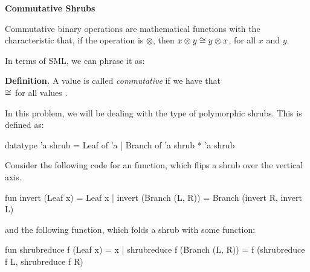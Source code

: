 \documentclass[addpoints,12pt, answers]{exam}
\begin{document}
\begin{questions}

\newpage
{}

\textbf{Commutative Shrubs}

Commutative binary operations are mathematical functions with the characteristic
that, if the operation is $\otimes$, then $x \otimes y \cong y \otimes x$, for
all $x$ and $y$.

In terms of SML, we can phrase it as:

\textbf{Definition.} A value  is called \textit{commutative} if
we have that \\
 $\cong$  for all values .

In this problem, we will be dealing with the type of polymorphic shrubs. This is
defined as:
\begin{codeblock}
  datatype 'a shrub =
      Leaf of 'a
    | Branch of 'a shrub * 'a shrub
\end{codeblock}

Consider the following code for an  function,
which flips a shrub over the vertical axis.
\begin{codeblock}
  fun invert (Leaf x) = Leaf x
    | invert (Branch (L, R)) =
        Branch (invert R, invert L)
\end{codeblock}
and the following  function, which folds a shrub with
some function:
\begin{codeblock}
  fun shrubreduce f (Leaf x) = x
    | shrubreduce f (Branch (L, R)) =
        f (shrubreduce f L, shrubreduce f R)
\end{codeblock}


\end{questions}
\end{document}
